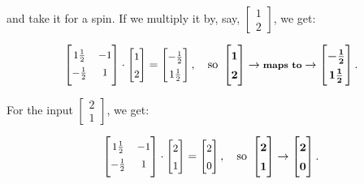 \label{mmatrix}

and take it for a spin. If we multiply it by, say, {\footnotesize $\begin{bmatrix} 1
\\ 2 \end{bmatrix}$}, we get:

\begin{align*}
\renewcommand*{\arraystretch}{1.4}
\small
\begin{bmatrix}
1\frac{1}{2} & -1 \\
\smallskip
-\frac{1}{2} & 1 \\
\end{bmatrix} \cdot
\begin{bmatrix}
1 \\ 2 \\
\end{bmatrix} =
\begin{bmatrix}
-\frac{1}{2} \\ 1\frac{1}{2} \\
\end{bmatrix}, \normalsize \quad \textrm{so}\
\boldmath
\begin{bmatrix}
1 \\ 2 \\
\end{bmatrix} \rightarrow \textrm{\textbf{\footnotesize maps to}} \rightarrow
\begin{bmatrix}
-\frac{1}{2} \\ 1\frac{1}{2} \\
\end{bmatrix}.
\unboldmath
\end{align*}

\label{thatExample}
For the input {\footnotesize $\begin{bmatrix} 2 \\ 1 \end{bmatrix}$}, we get:

\vspace{-.2in}
\begin{align*}
\renewcommand*{\arraystretch}{1.4}
\small
\begin{bmatrix}
1\frac{1}{2} & -1 \\
\smallskip
-\frac{1}{2} & 1 \\
\end{bmatrix} \cdot
\begin{bmatrix}
2 \\ 1 \\
\end{bmatrix} =
\begin{bmatrix}
2 \\ 0 \\
\end{bmatrix}, \normalsize \quad \textrm{so}\
\boldmath
\begin{bmatrix}
2 \\ 1 \\
\end{bmatrix} \rightarrow
\begin{bmatrix}
2 \\ 0 \\
\end{bmatrix}.
\unboldmath
\end{align*}

